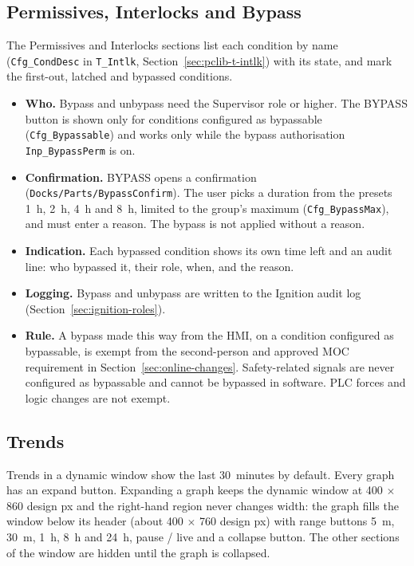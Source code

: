 \subsection[Permissives, Interlocks and Bypass]{Permissives, Interlocks and Bypass \newmark}\label{sec:hmi-bypass}
The Permissives and Interlocks sections list each condition by name (\texttt{Cfg\_CondDesc} in \texttt{T\_Intlk}, Section~\ref{sec:pclib-t-intlk}) with its state, and mark the first-out, latched and bypassed conditions.
\begin{itemize}[itemsep=1pt]
  \item \textbf{Who.} Bypass and unbypass need the Supervisor role or higher. The BYPASS button is shown only for conditions configured as bypassable (\texttt{Cfg\_Bypassable}) and works only while the bypass authorisation \texttt{Inp\_BypassPerm} is on.
  \item \textbf{Confirmation.} BYPASS opens a confirmation (\texttt{Docks/Parts/BypassConfirm}). The user picks a duration from the presets 1~h, 2~h, 4~h and 8~h, limited to the group's maximum (\texttt{Cfg\_BypassMax}), and must enter a reason. The bypass is not applied without a reason.
  \item \textbf{Indication.} Each bypassed condition shows its own time left and an audit line: who bypassed it, their role, when, and the reason.
  \item \textbf{Logging.} Bypass and unbypass are written to the Ignition audit log (Section~\ref{sec:ignition-roles}).
  \item \textbf{Rule.} A bypass made this way from the HMI, on a condition configured as bypassable, is exempt from the second-person and approved MOC requirement in Section~\ref{sec:online-changes}. Safety-related signals are never configured as bypassable and cannot be bypassed in software. PLC forces and logic changes are not exempt.
\end{itemize}

\subsection[Trends]{Trends \newmark}\label{sec:hmi-trends}
Trends in a dynamic window show the last 30~minutes by default. Every graph has an expand button. Expanding a graph keeps the dynamic window at 400 $\times$ 860 design px and the right-hand region never changes width: the graph fills the window below its header (about 400 $\times$ 760 design px) with range buttons 5~m, 30~m, 1~h, 8~h and 24~h, pause /\allowbreak{} live and a collapse button. The other sections of the window are hidden until the graph is collapsed.
